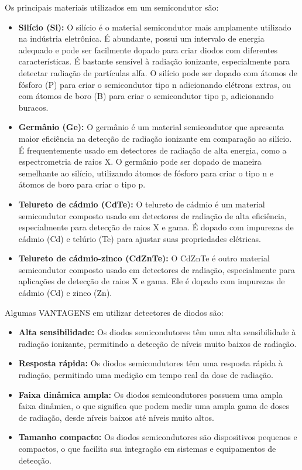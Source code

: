 \documentclass[11pt,a4paper]{article}
\begin{document}
		Os principais materiais utilizados em um semicondutor são:

			\begin{itemize}[label=\textcolor{CarnationPink}{$\star$}]
				\item \textbf{Silício (Si):} O silício é o material semicondutor mais amplamente utilizado na indústria eletrônica. É abundante, possui um intervalo de energia adequado e pode ser facilmente dopado para criar diodos com diferentes características. É bastante sensível à radiação ionizante, especialmente para detectar radiação de partículas alfa. O silício pode ser dopado com átomos de fósforo (P) para criar o semicondutor tipo n adicionando elétrons extras, ou com átomos de boro (B) para criar o semicondutor tipo p, adicionando buracos.
				
				\item \textbf{Germânio (Ge):} O germânio é um material semicondutor que apresenta maior eficiência na detecção de radiação ionizante em comparação ao silício. É frequentemente usado em detectores de radiação de alta energia, como a espectrometria de raios X.  O germânio pode ser dopado de maneira semelhante ao silício, utilizando átomos de fósforo para criar o tipo n e átomos de boro para criar o tipo p.
				
				\item \textbf{Telureto de cádmio (CdTe):} O telureto de cádmio é um material semicondutor composto usado em detectores de radiação de alta eficiência, especialmente para detecção de raios X e gama. É dopado com impurezas de cádmio (Cd) e telúrio (Te) para ajustar suas propriedades elétricas.

				\item \textbf{Telureto de cádmio-zinco (CdZnTe):} O CdZnTe é outro material semicondutor composto usado em detectores de radiação, especialmente para aplicações de detecção de raios X e gama. Ele é dopado com impurezas de cádmio (Cd) e zinco (Zn).
			\end{itemize}

			Algumas \textcolor{CarnationPink}{VANTAGENS} em utilizar detectores de diodos são:

			\begin{itemize}[label=\textcolor{CarnationPink}{$\blacktriangleright$}]
				\item \textbf{Alta sensibilidade:} Os diodos semicondutores têm uma alta sensibilidade à radiação ionizante, permitindo a detecção de níveis muito baixos de radiação.
				\item \textbf{Resposta rápida:} Os diodos semicondutores têm uma resposta rápida à radiação, permitindo uma medição em tempo real da dose de radiação.
				\item \textbf{Faixa dinâmica ampla:} Os diodos semicondutores possuem uma ampla faixa dinâmica, o que significa que podem medir uma ampla gama de doses de radiação, desde níveis baixos até níveis muito altos.
				\item \textbf{Tamanho compacto:} Os diodos semicondutores são dispositivos pequenos e compactos, o que facilita sua integração em sistemas e equipamentos de detecção.
			\end{itemize}
\end{document}
